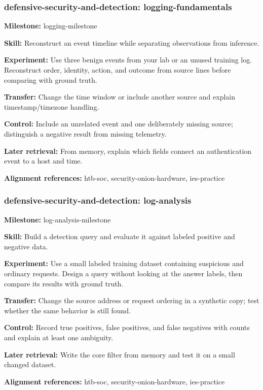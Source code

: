 \subsubsection{defensive-security-and-detection: logging-fundamentals}
\noindent\textbf{Milestone:} logging-milestone\par
\noindent\textbf{Skill:} Reconstruct an event timeline while separating observations from inference.\par
\noindent\textbf{Experiment:} Use three benign events from your lab or an unused training log. Reconstruct order, identity, action, and outcome from source lines before comparing with ground truth.\par
\noindent\textbf{Transfer:} Change the time window or include another source and explain timestamp/timezone handling.\par
\noindent\textbf{Control:} Include an unrelated event and one deliberately missing source; distinguish a negative result from missing telemetry.\par
\noindent\textbf{Later retrieval:} From memory, explain which fields connect an authentication event to a host and time.\par
\noindent\textbf{Alignment references:} htb-soc, security-onion-hardware, ies-practice\par
\subsubsection{defensive-security-and-detection: log-analysis}
\noindent\textbf{Milestone:} log-analysis-milestone\par
\noindent\textbf{Skill:} Build a detection query and evaluate it against labeled positive and negative data.\par
\noindent\textbf{Experiment:} Use a small labeled training dataset containing suspicious and ordinary requests. Design a query without looking at the answer labels, then compare its results with ground truth.\par
\noindent\textbf{Transfer:} Change the source address or request ordering in a synthetic copy; test whether the same behavior is still found.\par
\noindent\textbf{Control:} Record true positives, false positives, and false negatives with counts and explain at least one ambiguity.\par
\noindent\textbf{Later retrieval:} Write the core filter from memory and test it on a small changed dataset.\par
\noindent\textbf{Alignment references:} htb-soc, security-onion-hardware, ies-practice\par
